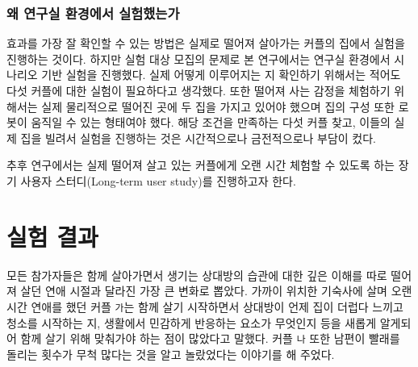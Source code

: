 
\subsubsection{왜 연구실 환경에서 실험했는가}

 효과를 가장 잘 확인할 수 있는 방법은 실제로 떨어져 살아가는 커플의 집에서 실험을 진행하는 것이다. 하지만 실험 대상 모집의 문제로 본 연구에서는 연구실 환경에서 시나리오 기반 실험을 진행했다. 실제 \concept\가 어떻게 이루어지는 지 확인하기 위해서는 적어도 다섯 커플에 대한 실험이 필요하다고 생각했다. 또한 떨어져 사는 감정을 체험하기 위해서는 실제 물리적으로 떨어진 곳에 두 집을 가지고 있어야 했으며 집의 구성 또한 로봇이 움직일 수 있는 형태여야 했다. 해당 조건을 만족하는 다섯 커플 찾고, 이들의 실제 집을 빌려서 실험을 진행하는 것은 시간적으로나 금전적으로나 부담이 컸다.

추후 연구에서는 실제 떨어져 살고 있는 커플에게 \sysname\을 오랜 시간 체험할 수 있도록 하는 장기 사용자 스터디(Long-term user study)를 진행하고자 한다.


\section{실험 결과}




모든 참가자들은 함께 살아가면서 생기는 상대방의 습관에 대한 깊은 이해를 따로 떨어져 살던 연애 시절과 달라진 가장 큰 변화로 뽑았다. 가까이 위치한 기숙사에 살며 오랜시간 연애를 했던 커플 \texttt{가}는 함께 살기 시작하면서 상대방이 언제 집이 더럽다 느끼고 청소를 시작하는 지, 생활에서 민감하게 반응하는 요소가 무엇인지 등을 새롭게 알게되어 함께 살기 위해 맞춰가야 하는 점이 많았다고 말했다. 커플 \texttt{나} 또한 남편이 빨래를 돌리는 횟수가 무척 많다는 것을 알고 놀랐었다는 이야기를 해 주었다.


